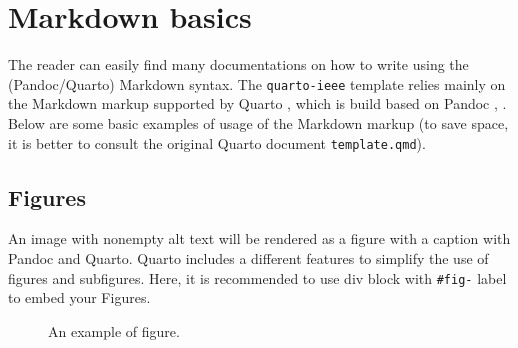 \documentclass[
  journal,
]{IEEEtran}%
\begin{document}
\section{Markdown basics}\label{sec-Markdown}

The reader can easily find many documentations on how to write using the
(Pandoc/Quarto) Markdown syntax. The \texttt{quarto-ieee} template
relies mainly on the Markdown markup supported by Quarto
, which is build based on Pandoc
,
. Below are some basic
examples of usage of the Markdown markup (to save space, it is better to
consult the original Quarto document \texttt{template.qmd}).

\subsection{Figures}\label{figures}

An image with nonempty alt text will be rendered as a figure with a
caption with Pandoc and Quarto. Quarto includes a different features to
simplify the use of figures and subfigures. Here, it is recommended to
use div block with \texttt{\#fig-} label to embed your Figures.

\begin{figure}


\caption{\label{fig-1}An example of figure.}

\end{figure}%
\end{document}
